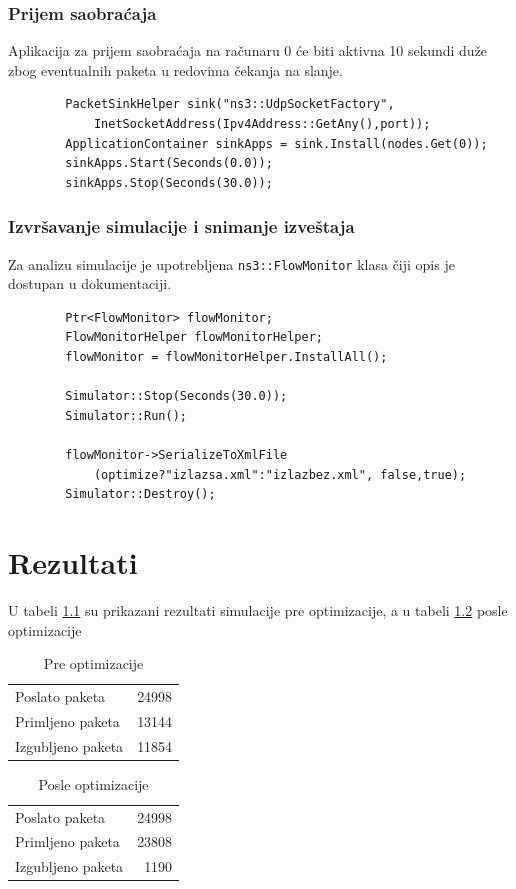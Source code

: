 \documentclass[a4paper, 12pt, projekat]{etf}
\begin{document}
	\subsection{Prijem saobraćaja}
	Aplikacija za prijem saobraćaja na računaru 0 će biti aktivna 10 sekundi duže zbog eventualnih paketa u redovima čekanja na slanje.
	\begin{verbatim}
		PacketSinkHelper sink("ns3::UdpSocketFactory",
		    InetSocketAddress(Ipv4Address::GetAny(),port));
		ApplicationContainer sinkApps = sink.Install(nodes.Get(0));
		sinkApps.Start(Seconds(0.0));
		sinkApps.Stop(Seconds(30.0));
	\end{verbatim}
	\subsection{Izvršavanje simulacije i snimanje izveštaja}
	Za analizu simulacije je upotrebljena \verb|ns3::FlowMonitor| klasa čiji opis je dostupan u dokumentaciji.\cite{ns3doc}
	\begin{verbatim}
		Ptr<FlowMonitor> flowMonitor;
		FlowMonitorHelper flowMonitorHelper;
		flowMonitor = flowMonitorHelper.InstallAll();
		
		Simulator::Stop(Seconds(30.0));
		Simulator::Run();
		
		flowMonitor->SerializeToXmlFile
		    (optimize?"izlazsa.xml":"izlazbez.xml", false,true);
		Simulator::Destroy();
	\end{verbatim}
	
	
	\chapter{Rezultati}
	U tabeli \ref{tab:pakpre} su prikazani rezultati simulacije pre optimizacije, a u tabeli \ref{tab:pakposle} posle optimizacije
	\begin{table}[htb]
		\centering
		\caption{Pre optimizacije}
		\label{tab:pakpre}
		\medskip
		\begin{tabular}{l|r}
			\hline
			Poslato paketa & 24998 \\
			Primljeno paketa & 13144 \\
			Izgubljeno paketa & 11854 \\
		\end{tabular}
	\end{table}
	\begin{table}[htb]
		\centering
		\caption{Posle optimizacije}
		\label{tab:pakposle}
		\medskip
		\begin{tabular}{l|r}
			\hline
			Poslato paketa & 24998 \\
			Primljeno paketa & 23808 \\
			Izgubljeno paketa & 1190 
		\end{tabular}
	\end{table}
	
\end{document}
